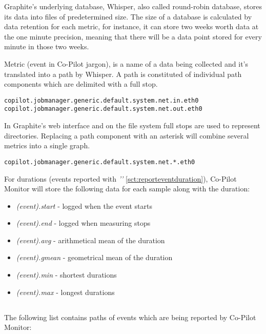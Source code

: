 Graphite's underlying database, Whisper, also called round-robin database, stores its data into files of predetermined size.
The size of a database is calculated by data retention for each metric, for instance, it can store two weeks worth data at the one minute precision, meaning
that there will be a data point stored for every minute in those two weeks.

Metric (event in Co-Pilot jargon), is a name of a data being collected and it's translated into a path by Whisper.
A path is constituted of individual path components which are delimited with a full stop.

\lstset{caption=Example Graphite paths}
\begin{lstlisting}
copilot.jobmanager.generic.default.system.net.in.eth0
copilot.jobmanager.generic.default.system.net.out.eth0
\end{lstlisting}

In Graphite's web interface and on the file system full stops are used to represent directories.
Replacing a path component with an asterisk will combine several metrics into a single graph.

\lstset{caption=Combined Graphite path}
\begin{lstlisting}
copilot.jobmanager.generic.default.system.net.*.eth0
\end{lstlisting}

For durations (events reported with \emph{''} \ref{sct:reporteventduration}),
Co-Pilot Monitor will store the following data for each sample along with the duration:
\begin{itemize}
  \item \emph{(event).start} - logged when the event starts
  \item \emph{(event).end} - logged when measuring stops
  \item \emph{(event).avg} - arithmetical mean of the duration
  \item \emph{(event).gmean} - geometrical mean of the duration
  \item \emph{(event).min} - shortest durations
  \item \emph{(event).max} - longest durations
\end{itemize}

\subsection{}
\label{sct:monitoredevents}
The following list contains paths of events which are being reported by Co-Pilot Monitor:

